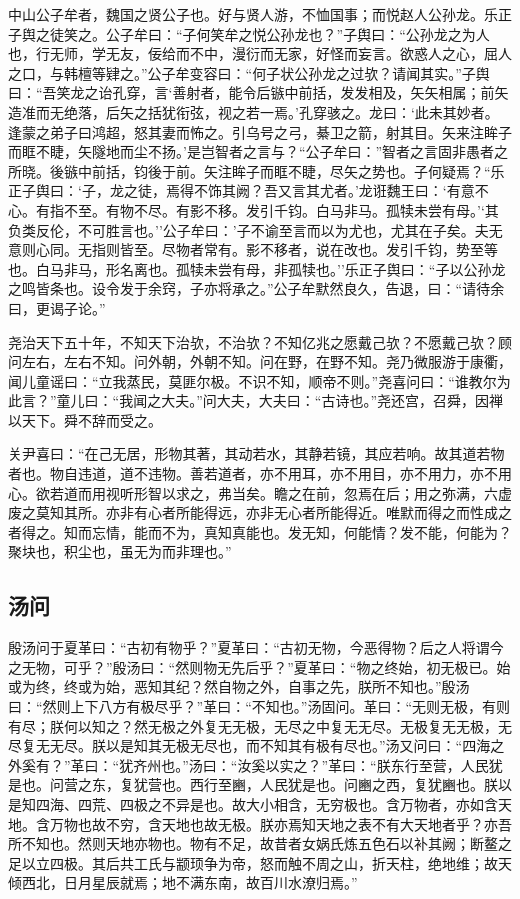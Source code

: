 \documentclass[]{article}
\begin{document}
中山公子牟者，魏国之贤公子也。好与贤人游，不恤国事；而悦赵人公孙龙。乐正子舆之徒笑之。公子牟曰：``子何笑牟之悦公孙龙也？''子舆曰：``公孙龙之为人也，行无师，学无友，佞给而不中，漫衍而无家，好怪而妄言。欲惑人之心，屈人之口，与韩檀等肄之。''公子牟变容曰：``何子状公孙龙之过欤？请闻其实。''子舆曰：``吾笑龙之诒孔穿，言`善射者，能令后镞中前括，发发相及，矢矢相属；前矢造准而无绝落，后矢之括犹衔弦，视之若一焉。'孔穿骇之。龙曰：`此未其妙者。逢蒙之弟子曰鸿超，怒其妻而怖之。引乌号之弓，綦卫之箭，射其目。矢来注眸子而眶不睫，矢隧地而尘不扬。'是岂智者之言与？``公子牟曰：''智者之言固非愚者之所晓。後镞中前括，钧後于前。矢注眸子而眶不睫，尽矢之势也。子何疑焉？``乐正子舆曰：`子，龙之徒，焉得不饰其阙？吾又言其尤者。'龙诳魏王曰：`有意不心。有指不至。有物不尽。有影不移。发引千钧。白马非马。孤犊未尝有母。'`其负类反伦，不可胜言也。''公子牟曰：'子不谕至言而以为尤也，尤其在子矣。夫无意则心同。无指则皆至。尽物者常有。影不移者，说在改也。发引千钧，势至等也。白马非马，形名离也。孤犊未尝有母，非孤犊也。''乐正子舆曰：``子以公孙龙之鸣皆条也。设令发于余窍，子亦将承之。''公子牟默然良久，告退，曰：``请待余曰，更谒子论。''

尧治天下五十年，不知天下治欤，不治欤？不知亿兆之愿戴己欤？不愿戴己欤？顾问左右，左右不知。问外朝，外朝不知。问在野，在野不知。尧乃微服游于康衢，闻儿童谣曰：``立我蒸民，莫匪尔极。不识不知，顺帝不则。''尧喜问曰：``谁教尔为此言？''童儿曰：``我闻之大夫。''问大夫，大夫曰：``古诗也。''尧还宫，召舜，因禅以天下。舜不辞而受之。

关尹喜曰：``在己无居，形物其著，其动若水，其静若镜，其应若响。故其道若物者也。物自违道，道不违物。善若道者，亦不用耳，亦不用目，亦不用力，亦不用心。欲若道而用视听形智以求之，弗当矣。瞻之在前，忽焉在后；用之弥满，六虚废之莫知其所。亦非有心者所能得远，亦非无心者所能得近。唯默而得之而性成之者得之。知而忘情，能而不为，真知真能也。发无知，何能情？发不能，何能为？聚块也，积尘也，虽无为而非理也。''

\hypertarget{header-n76}{%
\subsection{汤问}\label{header-n76}}

殷汤问于夏革曰：``古初有物乎？''夏革曰：``古初无物，今恶得物？后之人将谓今之无物，可乎？''殷汤曰：``然则物无先后乎？''夏革曰：``物之终始，初无极已。始或为终，终或为始，恶知其纪？然自物之外，自事之先，朕所不知也。''殷汤曰：``然则上下八方有极尽乎？''革曰：``不知也。''汤固问。革曰：``无则无极，有则有尽；朕何以知之？然无极之外复无无极，无尽之中复无无尽。无极复无无极，无尽复无无尽。朕以是知其无极无尽也，而不知其有极有尽也。''汤又问曰：``四海之外奚有？''革曰：``犹齐州也。''汤曰：``汝奚以实之？''革曰：``朕东行至营，人民犹是也。问营之东，复犹营也。西行至豳，人民犹是也。问豳之西，复犹豳也。朕以是知四海、四荒、四极之不异是也。故大小相含，无穷极也。含万物者，亦如含天地。含万物也故不穷，含天地也故无极。朕亦焉知天地之表不有大天地者乎？亦吾所不知也。然则天地亦物也。物有不足，故昔者女娲氏炼五色石以补其阙；断鳌之足以立四极。其后共工氏与颛顼争为帝，怒而触不周之山，折天柱，绝地维；故天倾西北，日月星辰就焉；地不满东南，故百川水潦归焉。''
\end{document}
